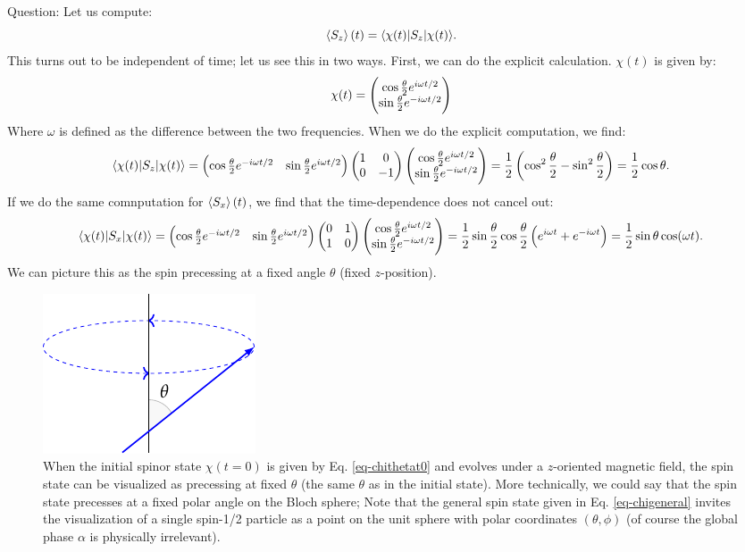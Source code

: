 Question: Let us compute:
\begin{equation}
    \left< S_z \right>(t) = \langle \chi(t) \rvert S_z\lvert \chi(t) \rangle.
\end{equation}
This turns out to be independent of time; let us see this in two ways. First, we can do the explicit calculation. $\chi(t)$ is given by:
\begin{equation}
    \chi(t) = \begin{pmatrix}\cos\frac{\theta}{2} e^{i\omega t/2} \\ \sin\frac{\theta}{2} e^{-i\omega t/2}\end{pmatrix}
\end{equation}
Where $\omega$ is defined as the difference between the two frequencies. When we do the explicit computation, we find:
\begin{equation}
    \langle \chi(t) \rvert S_z\lvert \chi(t) \rangle = \begin{pmatrix}\cos\frac{\theta}{2} e^{-i\omega t/2}& \sin\frac{\theta}{2} e^{i\omega t/2}\end{pmatrix}\begin{pmatrix} 1 & 0 \\ 0 & -1 \end{pmatrix} \begin{pmatrix}\cos\frac{\theta}{2} e^{i\omega t/2} \\ \sin\frac{\theta}{2} e^{-i\omega t/2}\end{pmatrix} =  \frac{1}{2}\left(\cos^2\frac{\theta}{2} - \sin^2\frac{\theta}{2}\right) = \frac{1}{2}\cos\theta.
\end{equation}
If we do the same comnputation for $\left< S_x \right>(t)$, we find that the time-dependence does not cancel out:
\begin{equation}
    \langle \chi(t) \rvert S_x\lvert \chi(t) \rangle = \begin{pmatrix}\cos\frac{\theta}{2} e^{-i\omega t/2}& \sin\frac{\theta}{2} e^{i\omega t/2}\end{pmatrix}\begin{pmatrix} 0 & 1 \\ 1 & 0 \end{pmatrix} \begin{pmatrix}\cos\frac{\theta}{2} e^{i\omega t/2} \\ \sin\frac{\theta}{2} e^{-i\omega t/2}\end{pmatrix} =  \frac{1}{2}\sin\frac{\theta}{2}\cos\frac{\theta}{2}\left(e^{i\omega t} + e^{-i\omega t}\right) = \frac{1}{2}\sin\theta\cos(\omega t).
\end{equation}
We can picture this as the spin precessing at a fixed angle $\theta$ (fixed $z$-position).

\begin{figure}[htbp]
    \centering
    \includegraphics[]{Images/fig-spinprecess.pdf}

    \caption{When the initial spinor state $\chi(t = 0)$ is given by Eq. \eqref{eq-chithetat0} and evolves under a $z$-oriented magnetic field, the spin state can be visualized as precessing at fixed $\theta$ (the same $\theta$ as in the initial state). More technically, we could say that the spin state precesses at a fixed polar angle on the Bloch sphere; Note that the general spin state given in Eq. \eqref{eq-chigeneral} invites the visualization of a single spin-1/2 particle as a point on the unit sphere with polar coordinates $(\theta, \phi)$ (of course the global phase $\alpha$ is physically irrelevant).}
    \label{fig-spinprecess}
\end{figure}

